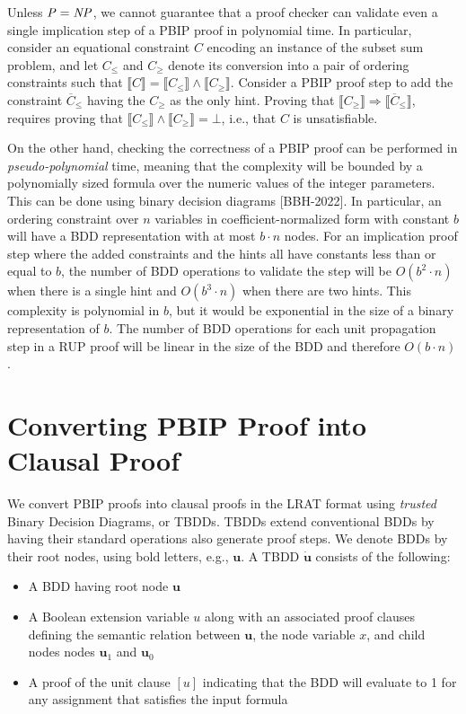 \documentclass{easychair}
\newcommand{\nil}{\bot}
\renewcommand{\obar}[1]{\overline{#1}}
\newcommand{\trust}[1]{\dot {#1}}
\newcommand{\imply}{\Rightarrow}
\newcommand{\func}[1]{\llbracket#1\rrbracket}
\newcommand{\node}[1]{\mathbf{#1}}
\newcommand{\nodeu}{\node{u}}
\begin{document}
Unless ${\it P} = {\it NP}$, we cannot guarantee that a proof checker
can validate even a single implication step of a PBIP proof in polynomial time.
In particular, consider an equational constraint $C$ encoding an
instance of the subset sum problem, and let $C_{\leq}$ and $C_{\geq}$
denote its conversion into a pair of ordering constraints such that
$\func{C} = \func{C_{\leq}} \land \func{C_{\geq}}$.  Consider a PBIP
proof step to add the constraint $\obar{C}_{\leq}$ having the 
$C_{\geq}$ as the only hint.  Proving that
$\func{C_{\geq}} \imply \func{\obar{C}_{\leq}}$, requires proving that
$\func{C_{\leq}} \land \func{C_{\geq}} = \nil$, i.e., that $C$ is unsatisfiable.

On the other hand, checking the correctness of a PBIP proof can be
performed in {\em pseudo-polynomial} time, meaning that the complexity
will be bounded by a polynomially sized formula over the numeric
values of the integer parameters.  This can be done using binary
decision diagrams [BBH-2022].  In particular, an ordering constraint
over $n$ variables in coefficient-normalized form with constant $b$
will have a BDD representation with at most $b \cdot n$ nodes.  For an
implication proof step where the added constraints and the hints all
have constants less than or equal to $b$, the number of BDD operations
to validate the step will be $O(b^{2} \cdot n)$ when there is a single
hint and $O(b^{3} \cdot n)$ when there are two hints.  This complexity
is polynomial in $b$, but it would be exponential in the size of a
binary representation of $b$.  The number of BDD operations
for each unit propagation step in a RUP proof will be linear in the
size of the BDD and therefore $O(b \cdot n)$\@.


\section{Converting PBIP Proof into Clausal Proof}

We convert PBIP proofs into clausal proofs in the LRAT format using
{\em trusted} Binary Decision Diagrams, or TBDDs.  TBDDs extend
conventional BDDs by having their standard operations also generate proof steps.
We denote BDDs by their root nodes, using bold letters, e.g., $\nodeu$.
A TBDD $\trust{\nodeu}$ consists of the following:
\begin{itemize}
\item A BDD having root node $\nodeu$
\item A Boolean extension variable $u$ along with an associated
  proof clauses defining the semantic relation between $\nodeu$,  the node variable $x$, and 
  child nodes
  nodes $\nodeu_1$ and $\nodeu_0$
\item A proof of the unit clause $[u]$ indicating that the BDD will evaluate to 1 for any assignment that satisfies the input formula
\end{itemize}
\end{document}
